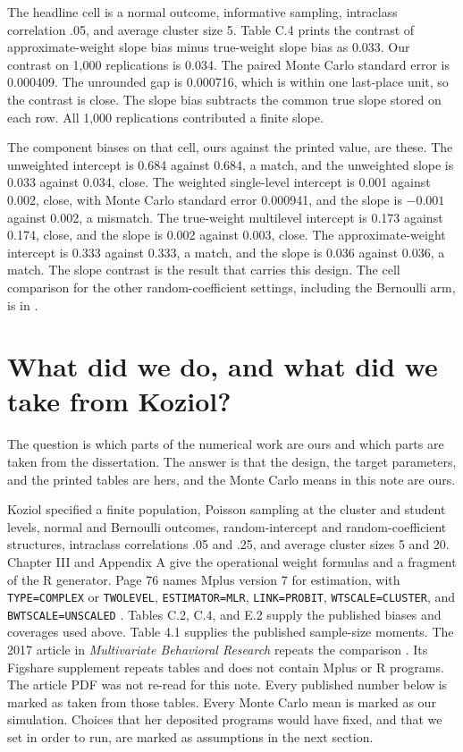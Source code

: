 The headline cell is a normal outcome, informative sampling, intraclass
correlation .05, and average cluster size 5.
Table C.4 prints the contrast of approximate-weight slope bias minus
true-weight slope bias as 0.033.
Our contrast on 1,000 replications is 0.034.
The paired Monte Carlo standard error is 0.000409.
The unrounded gap is 0.000716, which is within one last-place unit, so the
contrast is close.
The slope bias subtracts the common true slope stored on each row.
All 1,000 replications contributed a finite slope.

The component biases on that cell, ours against the printed value, are these.
The unweighted intercept is 0.684 against 0.684, a match, and the unweighted
slope is 0.033 against 0.034, close.
The weighted single-level intercept is 0.001 against 0.002, close, with Monte
Carlo standard error 0.000941, and the slope is $-0.001$ against 0.002, a
mismatch.
The true-weight multilevel intercept is 0.173 against 0.174, close, and the
slope is 0.002 against 0.003, close.
The approximate-weight intercept is 0.333 against 0.333, a match, and the
slope is 0.036 against 0.036, a match.
The slope contrast is the result that carries this design.
The cell comparison for the other random-coefficient settings, including the
Bernoulli arm, is in .

\section{What did we do, and what did we take from Koziol?}

The question is which parts of the numerical work are ours and which parts are
taken from the dissertation.
The answer is that the design, the target parameters, and the printed tables
are hers, and the Monte Carlo means in this note are ours.

Koziol specified a finite population, Poisson sampling at the cluster and
student levels, normal and Bernoulli outcomes, random-intercept and
random-coefficient structures, intraclass correlations .05 and .25, and
average cluster sizes 5 and 20.
Chapter III and Appendix A give the operational weight formulas and a fragment
of the R generator.
Page 76 names Mplus version 7 for estimation, with \texttt{TYPE=COMPLEX} or
\texttt{TWOLEVEL}, \texttt{ESTIMATOR=MLR}, \texttt{LINK=PROBIT},
\texttt{WTSCALE=CLUSTER}, and \texttt{BWTSCALE=UNSCALED}
\citep{muthen2012}.
Tables C.2, C.4, and E.2 supply the published biases and coverages used above.
Table 4.1 supplies the published sample-size moments.
The 2017 article in \emph{Multivariate Behavioral Research} repeats the
comparison \citep{koziol2017}.
Its Figshare supplement repeats tables and does not contain Mplus or R
programs.
The article PDF was not re-read for this note.
Every published number below is marked as taken from those tables.
Every Monte Carlo mean is marked as our simulation.
Choices that her deposited programs would have fixed, and that we set in order
to run, are marked as assumptions in the next section.

